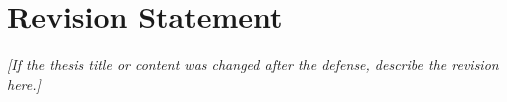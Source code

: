 \chapter*{Revision Statement}
\label{edit}

\textit{[If the thesis title or content was changed after the defense,
describe the revision here.]}
